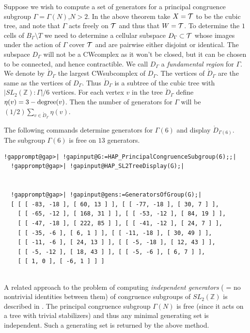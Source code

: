 \documentclass[a4paper,11pt]{report}
\begin{document}
{{ Suppose we wish to compute a set of generators for a principal congruence
subgroup $\Gamma=\Gamma(N)$,$N>2$. In the above theorem take $X={\cal T}$ to be the cubic tree, and note that $\Gamma$ acts freely on $\cal T$ and thus that $W={\cal T}$. To determine the $1$\texttt{}cells of $B_{\Gamma}\setminus T$ we need to determine a cellular subspace $D_\Gamma \subset \cal T$ whose images under the action of $\Gamma$ cover $\cal T$ and are pairwise either disjoint or identical. The subspace $D_\Gamma$ will not be a CW\texttt{}complex as it won't be closed, but it can
be chosen to be connected, and hence contractible. We call $D_\Gamma$ a \emph{fundamental region} for $\Gamma$. We denote by $\mathring D_\Gamma$ the largest CW\texttt{}subcomplex of $D_\Gamma$. The vertices of $\mathring D_\Gamma$ are the same as the vertices of $D_\Gamma$. Thus $\mathring D_\Gamma$ is a subtree of the cubic tree with $|SL_2(\mathbb Z):\Gamma|/6$ vertices. For each vertex $v$ in the tree $\mathring D_\Gamma$ define $\eta(v)=3 -{\rm degree}(v)$. Then the number of generators for $ \Gamma $ will be $(1/2)\sum_{v\in \mathring D_\Gamma} \eta(v)$. 

 The following commands determine generators for $\Gamma(6)$ and display $\mathring D_{\Gamma(6)}$. The subgroup $\Gamma(6)$ is free on $13$ generators. 
\begin{Verbatim}[commandchars=!@|,fontsize=\small,frame=single,label=Example]
  !gapprompt@gap>| !gapinput@G:=HAP_PrincipalCongruenceSubgroup(6);;|
  !gapprompt@gap>| !gapinput@HAP_SL2TreeDisplay(G);|
  
  
  !gapprompt@gap>| !gapinput@gens:=GeneratorsOfGroup(G);|
  [ [ [ -83, -18 ], [ 60, 13 ] ], [ [ -77, -18 ], [ 30, 7 ] ], 
    [ [ -65, -12 ], [ 168, 31 ] ], [ [ -53, -12 ], [ 84, 19 ] ], 
    [ [ -47, -18 ], [ 222, 85 ] ], [ [ -41, -12 ], [ 24, 7 ] ], 
    [ [ -35, -6 ], [ 6, 1 ] ], [ [ -11, -18 ], [ 30, 49 ] ], 
    [ [ -11, -6 ], [ 24, 13 ] ], [ [ -5, -18 ], [ 12, 43 ] ], 
    [ [ -5, -12 ], [ 18, 43 ] ], [ [ -5, -6 ], [ 6, 7 ] ], 
    [ [ 1, 0 ], [ -6, 1 ] ] ]
  
\end{Verbatim}
 

  

A related approach to the problem of computing \emph{independent generators} ( = no nontrivial identities between them) of congruence subgroups of $SL_2(\mathbb Z)$ is described in \cite{kulkarni}. The principal congruence subgroup $\Gamma(N)$ is free (since it acts on a tree with trivial stabilizers) and thus any
minimal generating set is independent. Such a generating set is returned by
the above method. 

}}
\end{document}
